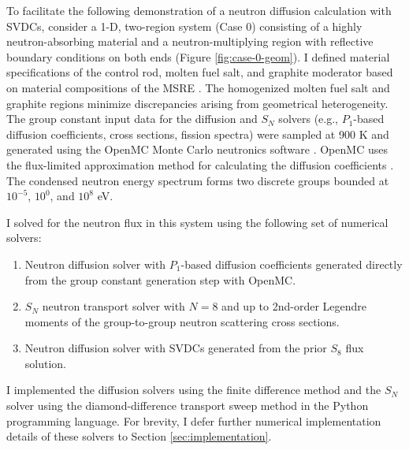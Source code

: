 To facilitate the following demonstration of a neutron diffusion calculation with \glspl{SVDC},
consider a 1-D, two-region system (Case 0) consisting of a highly neutron-absorbing material and a
neutron-multiplying region with reflective boundary conditions on both ends (Figure
\ref{fig:case-0-geom}). I defined material specifications of the control rod, molten fuel salt, and
graphite moderator based on material compositions of the \gls{MSRE} \cite{robertson_msre_1965}. The
homogenized molten fuel salt and graphite regions minimize discrepancies arising from geometrical
heterogeneity. The group constant input data for the diffusion and $S_N$ solvers (e.g., $P_1$-based
diffusion coefficients, cross
sections, fission spectra) were sampled at 900 K and generated using the OpenMC Monte Carlo
neutronics software \cite{romano_openmc:_2015}. OpenMC uses the flux-limited approximation method
for calculating the diffusion coefficients \cite{pomraning_flux-limited_1984}. The condensed
neutron energy spectrum forms two discrete groups bounded at $10^{-5}$, $10^0$, and $10^8$ eV.

I solved for the neutron flux in this system using the following set of numerical solvers:
%
\begin{enumerate}
  \item Neutron diffusion solver with $P_1$-based diffusion coefficients generated directly from
    the group constant generation step with OpenMC.
  \item $S_N$ neutron transport solver with $N=8$ and up to 2nd-order Legendre
    moments of the group-to-group neutron scattering cross sections.
  \item Neutron diffusion solver with \glspl{SVDC} generated from the prior $S_8$
    flux solution.
\end{enumerate}
%
I implemented the diffusion solvers using the finite difference method and the $S_N$
solver using the diamond-difference transport sweep method in the Python programming language. For
brevity, I defer further numerical implementation details of these solvers to Section
\ref{sec:implementation}.

